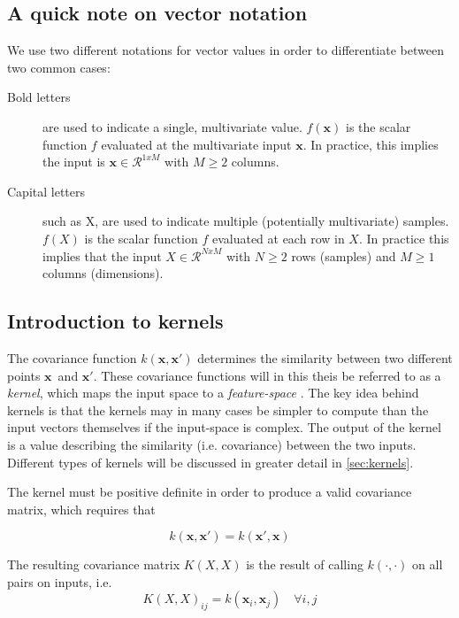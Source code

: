 \subsection{A quick note on vector notation}
We use two different notations for vector values in order to differentiate between two common cases:
\begin{description}
\item[Bold letters] are used to indicate a single, multivariate value. $f(\boldsymbol{x})$ is the scalar function $f$ evaluated at the multivariate input $\boldsymbol{x}$. In practice, this implies the input is $\boldsymbol{x} \in \mathcal{R}^{1 x M}$ with $M\geq 2$ columns.
\item[Capital letters] such as X, are used to indicate multiple (potentially multivariate) samples. $f(X)$ is the scalar function $f$ evaluated at each row in $X$. In practice this implies that the input $X \in \mathcal{R}^{N x M}$ with $N \geq 2$ rows (samples) and $M \geq 1$ columns (dimensions).
\end{description}

\subsection{Introduction to kernels}
The covariance function $k(\boldsymbol{x}, \boldsymbol{x}')$ determines the similarity between two different points $\boldsymbol{x}$ and $\boldsymbol{x}'$. These covariance functions will in this theis be referred to as a \textit{kernel}, which maps the input space to a \textit{feature-space} \cite{rasmussen}. The key idea behind kernels is that the kernels may in many cases be simpler to compute than the input vectors themselves if the input-space is complex. The output of the kernel is a value describing the similarity (i.e. covariance) between the two inputs. Different types of kernels will be discussed in greater detail in \cref{sec:kernels}.

The kernel must be positive definite in order to produce a valid covariance matrix, which requires that

\begin{equation}
    k(\boldsymbol{x}, \boldsymbol{x}') = k(\boldsymbol{x}', \boldsymbol{x})
\end{equation}

The resulting covariance matrix $K(X, X)$ is the result of calling $k(\cdot, \cdot)$ on all pairs on inputs, i.e.
\begin{equation}
    K(X, X)_{ij} = k(\boldsymbol{x}_i, \boldsymbol{x}_j) \quad \forall i, j
\end{equation}

